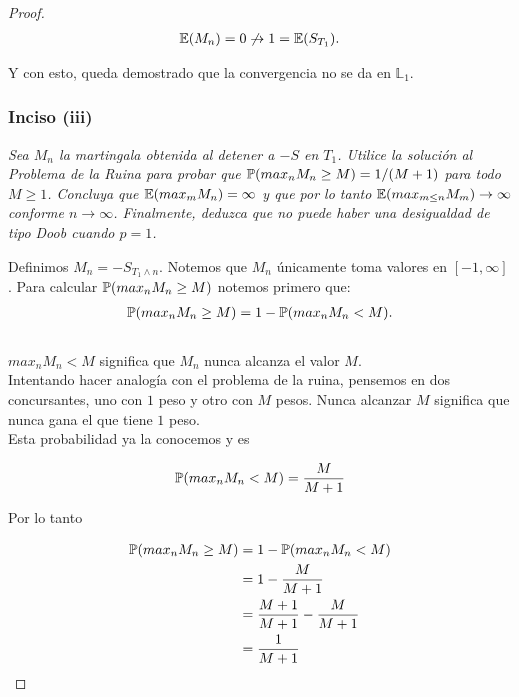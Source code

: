 \begin{proof}
		\begin{align}
			\mathbb{E}(M_n) = 0 \not\rightarrow 1 = \mathbb{E}(S_{T_1}).
		\end{align}			
		
		Y con esto, queda demostrado que la convergencia no se da en $\mathbb{L}_1$.\\
		
	\subsubsection{Inciso (iii)}		
	\emph{
		Sea $M_n$ la martingala obtenida al detener a $-S$ en $T_1$. Utilice la solución al
		Problema de la Ruina para probar que $\mathbb{P}(max_n M_n \geq M) = 1/(M+1)$ para todo $M \geq 1$. Concluya que
		$\mathbb{E}(max_m M_n) = \infty$ y que por lo tanto $\mathbb{E}(max_{m\leq n} M_m) \rightarrow \infty$ conforme 
		$n \rightarrow \infty$. Finalmente, deduzca que no puede haber una desigualdad de tipo Doob cuando $p=1$.\\
	}	

		Definimos $M_n = -S_{T_1 \wedge n}$. Notemos que $M_n$ únicamente toma valores en $[-1, \infty]$.
		Para calcular $\mathbb{P}(max_n M_n \geq M)$ notemos primero que:
		\begin{align}
			\mathbb{P}(max_n M_n \geq M) = 1 - \mathbb{P}(max_n M_n < M).
		\end{align}\\
		
		$max_n M_n < M$ significa que $M_n$ nunca alcanza el valor $M$.\\
		 
		Intentando hacer analogía con el problema de la ruina, pensemos en dos concursantes,
		uno con $1$ peso y otro con $M$ pesos. Nunca alcanzar $M$ significa que nunca gana el que tiene $1$ peso.\\
		
		Esta probabilidad ya la conocemos y es 
		
		\begin{align*}
			\mathbb{P}(max_n M_n < M) = \frac{M}{M + 1}
		\end{align*}
			
		Por lo tanto
		
		\begin{align}
			\mathbb{P}(max_n M_n \geq M) 	&= 1 - \mathbb{P}(max_n M_n < M) \\
									&= 1 - \frac{M}{M + 1}\\
									&= \frac{M+1}{M+1} - \frac{M}{M + 1}\\
									&= \frac{1}{M+1}
		\end{align}
		

\end{proof}
